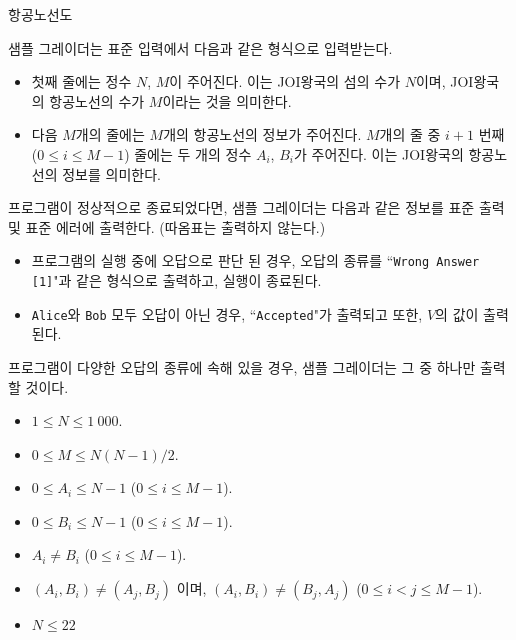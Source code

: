 \begin{problem}{항공노선도}
\InputFile



샘플 그레이더는 표준 입력에서 다음과 같은 형식으로 입력받는다.

\begin{itemize}
	\item 첫째 줄에는 정수 $N$, $M$이 주어진다. 이는 JOI왕국의 섬의 수가 $N$이며, JOI왕국의 항공노선의 수가 $M$이라는 것을 의미한다.
	\item 다음 $M$개의 줄에는 $M$개의 항공노선의 정보가 주어진다. $M$개의 줄 중 $i+1$ 번째 ($0 \le i \le M-1$) 줄에는 두 개의 정수 $A_i$, $B_i$가 주어진다. 이는 JOI왕국의 항공노선의 정보를 의미한다.
\end{itemize}

\OutputFile

프로그램이 정상적으로 종료되었다면, 샘플 그레이더는 다음과 같은 정보를 표준 출력 및 표준 에러에 출력한다. (따옴표는 출력하지 않는다.)

\begin{itemize}
	\item 프로그램의 실행 중에 오답으로 판단 된 경우, 오답의 종류를 ``\texttt{Wrong Answer [1]}"과 같은 형식으로 출력하고, 실행이 종료된다.
	
	\item \texttt{Alice}와 \texttt{Bob} 모두 오답이 아닌 경우, ``\texttt{Accepted}"가 출력되고 또한, $V$의 값이 출력된다.

\end{itemize}

프로그램이 다양한 오답의 종류에 속해 있을 경우, 샘플 그레이더는 그 중 하나만 출력 할 것이다.

\Constraints

\begin{itemize}
	\item $1 \le N \le 1\ 000$.
	\item $0 \le M \le N(N-1)/2$.
	\item $0 \le A_i \le N-1$ ($0 \le i \le M-1$).
	\item $0 \le B_i \le N-1$ ($0 \le i \le M-1$).
	\item $A_i \ne B_i$ ($0 \le i \le M-1$).
	\item $(A_i,B_i) \ne (A_j, B_j)$ 이며, $(A_i, B_i) \ne (B_j, A_j)$ ($0 \le  i < j \le M-1$).
\end{itemize}




\begin{itemize}
	\item $N \le 22$
\end{itemize}


\end{problem}
